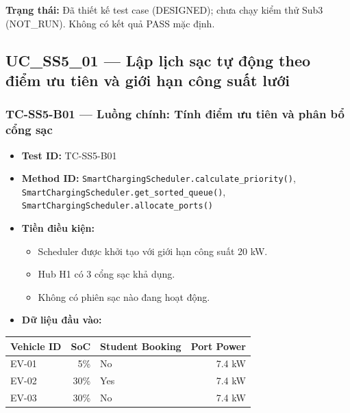 \documentclass[11pt,a4paper]{article}
\providecommand{\tightlist}{%
  \setlength{\itemsep}{0pt}\setlength{\parskip}{0pt}}
\begin{document}
\textbf{Trạng thái:} Đã thiết kế test case (DESIGNED); chưa chạy kiểm
thử Sub3 (NOT\_RUN). Không có kết quả PASS mặc định.

\hypertarget{uc_ss5_01-lux1eadp-lux1ecbch-sux1ea1c-tux1ef1-ux111ux1ed9ng-theo-ux111iux1ec3m-ux1b0u-tiuxean-vuxe0-giux1edbi-hux1ea1n-cuxf4ng-suux1ea5t-lux1b0ux1edbi}{%
\subsection{UC\_SS5\_01 --- Lập lịch sạc tự động theo điểm ưu tiên và
giới hạn công suất
lưới}\label{uc_ss5_01-lux1eadp-lux1ecbch-sux1ea1c-tux1ef1-ux111ux1ed9ng-theo-ux111iux1ec3m-ux1b0u-tiuxean-vuxe0-giux1edbi-hux1ea1n-cuxf4ng-suux1ea5t-lux1b0ux1edbi}}

\hypertarget{tc-ss5-b01-luux1ed3ng-chuxednh-tuxednh-ux111iux1ec3m-ux1b0u-tiuxean-vuxe0-phuxe2n-bux1ed5-cux1ed5ng-sux1ea1c}{%
\subsubsection{TC-SS5-B01 --- Luồng chính: Tính điểm ưu tiên và phân bổ
cổng
sạc}\label{tc-ss5-b01-luux1ed3ng-chuxednh-tuxednh-ux111iux1ec3m-ux1b0u-tiuxean-vuxe0-phuxe2n-bux1ed5-cux1ed5ng-sux1ea1c}}

\begin{itemize}
\tightlist
\item
  \textbf{Test ID:} TC-SS5-B01
\item
  \textbf{Method ID:}
  \texttt{SmartChargingScheduler.calculate\_priority()},
  \texttt{SmartChargingScheduler.get\_sorted\_queue()},
  \texttt{SmartChargingScheduler.allocate\_ports()}
\item
  \textbf{Tiền điều kiện:}

  \begin{itemize}
  \tightlist
  \item
    Scheduler được khởi tạo với giới hạn công suất 20 kW.
  \item
    Hub H1 có 3 cổng sạc khả dụng.
  \item
    Không có phiên sạc nào đang hoạt động.
  \end{itemize}
\item
  \textbf{Dữ liệu đầu vào:}
\end{itemize}

\begin{longtable}[]{@{}lrlr@{}}
\toprule\noalign{}
Vehicle ID & SoC & Student Booking & Port Power \\
\midrule\noalign{}
\endhead
\bottomrule\noalign{}
\endlastfoot
EV-01 & 5\% & No & 7.4 kW \\
EV-02 & 30\% & Yes & 7.4 kW \\
EV-03 & 30\% & No & 7.4 kW \\
\end{longtable}
\end{document}
